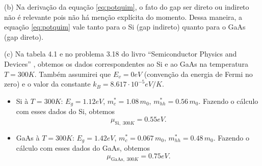 \documentclass[a4paper,10pt]{article}
\begin{document}
\n\n

(b) Na derivação da equação \ref{eq:potquim}, o fato do gap ser direto ou indireto não é relevante pois não há menção explícita do momento. Dessa maneira, a equação \ref{eq:potquim} vale tanto para o Si (gap indireto) quanto para o GaAs (gap direto).

\n\n

(c) Na tabela 4.1 e no problema 3.18 do livro ``Semiconductor Physics and Devices'' \cite{neamen}, obtemos os dados correspondentes ao Si e ao GaAs na temperatura $T = 300 \unit{K}$. Também assumirei que $E_v = 0 \unit{eV}$ (convenção da energia de Fermi no zero) e o valor da constante $k_B = 8.617 \cdot 10^{-5} \unit{eV/K}$.
\begin{itemize}
\item Si à $T = 300 \unit{K}$: $E_g = 1.12 \unit{eV}$, $m_c^* = 1.08 \, m_0$, $m_{hh}^* = 0.56 \, m_0$. Fazendo o cálculo com esses dados do Si, obtemos
$$
\boxed{\mu_{\text{Si}, \; 300\unit{K}} = 0.55 \unit{eV}.}
$$

\n

\item GaAs à $T = 300 \unit{K}$: $E_g = 1.42 \unit{eV}$, $m_c^* = 0.067 \, m_0$, $m_{hh}^* = 0.48 \, m_0$. Fazendo o cálculo com esses dados do GaAs, obtemos
$$
\boxed{\mu_{\text{GaAs}, \; 300\unit{K}} = 0.75 \unit{eV}.}
$$
\end{itemize}



%


\end{document}
